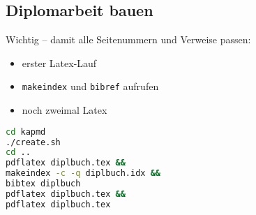 \subsection{Diplomarbeit bauen}\label{diplomarbeit-bauen}

Wichtig -- damit alle Seitenummern und Verweise passen:

\begin{itemize}
\tightlist
\item
  erster Latex-Lauf
\item
  \lstinline!makeindex! und \lstinline!bibref! aufrufen
\item
  noch zweimal Latex
\end{itemize}

\begin{lstlisting}[language=bash]
cd kapmd
./create.sh
cd ..
pdflatex diplbuch.tex &&
makeindex -c -q diplbuch.idx &&
bibtex diplbuch
pdflatex diplbuch.tex &&
pdflatex diplbuch.tex
\end{lstlisting}

